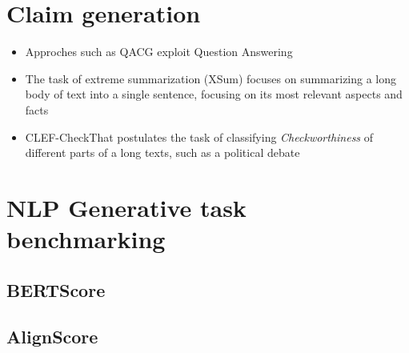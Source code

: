 \section{Claim generation}
\begin{itemize}
    \item Approches such as QACG exploit Question Answering
    \item The task of extreme summarization (XSum) focuses on summarizing a long body of text into a single sentence, focusing on its most relevant aspects and facts
    \item CLEF-CheckThat postulates the task of classifying \textit{Checkworthiness} of different parts of a long texts, such as a political debate
\end{itemize}

\section{NLP Generative task benchmarking}
\subsection{BERTScore}
\subsection{AlignScore}